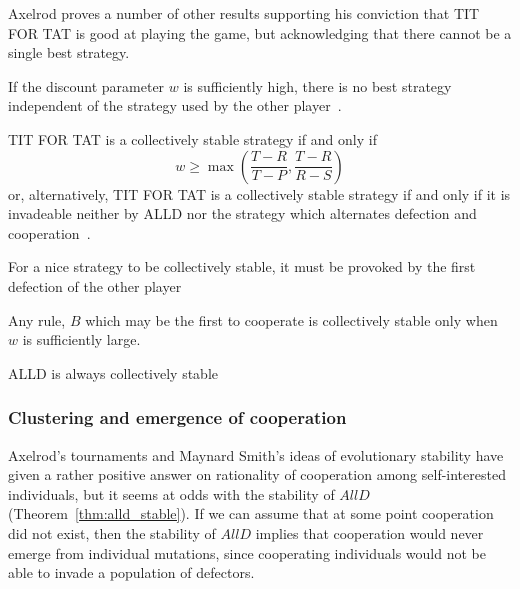 Axelrod proves a number of other results supporting his conviction that TIT FOR TAT is good at playing the game, but acknowledging that there cannot be a single best strategy.

\begin{theorem}
If the discount parameter $w$ is sufficiently high, there is no best strategy independent of the strategy used by the other player~\cite[Theorem 1]{RobertAxelrod_1981}.
\end{theorem}

\begin{theorem}
TIT FOR TAT is a collectively stable strategy if and only if
\[
w \geq \max \left( \frac{T-R}{T-P}, \frac{T-R}{R-S}\right)
\]
or, alternatively, TIT FOR TAT is a collectively stable strategy if and only if it is invadeable neither by ALLD nor the strategy which alternates defection and cooperation~\cite[Theorem 2]{RobertAxelrod_1981}.
\end{theorem}

\begin{theorem}
For a nice strategy to be collectively stable, it must be provoked by the first defection of the other player~\cite[Theorem 4]{RobertAxelrod_1981}
\end{theorem}

\begin{theorem}
Any rule, $B$ which may be the first to cooperate is collectively stable only when $w$ is sufficiently large.~\cite[Theorem 5]{RobertAxelrod_1981}
\end{theorem}

\begin{theorem}\label{thm:alld_stable}
ALLD is always collectively stable~\cite[Theorem 6]{RobertAxelrod_1981}
\end{theorem}


\subsubsection{Clustering and emergence of cooperation}
Axelrod's tournaments and Maynard Smith's ideas of evolutionary stability have given a rather positive answer on rationality of cooperation among self-interested individuals, but it seems at odds with the stability of $AllD$ (Theorem~\ref{thm:alld_stable}). If we can assume that at some point cooperation did not exist, then the stability of $AllD$ implies that cooperation would never emerge from individual mutations, since cooperating individuals would not be able to invade a population of defectors.

